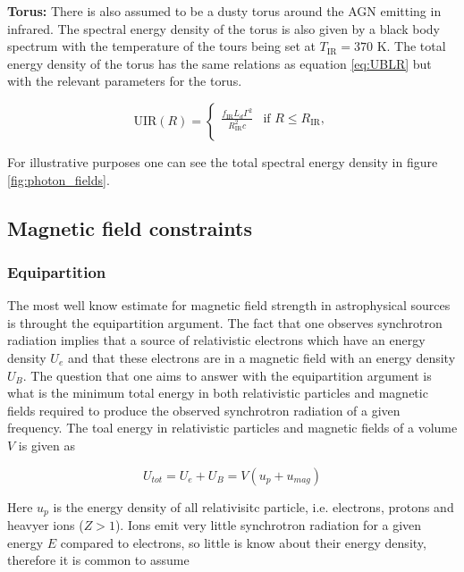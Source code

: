 \textbf{Torus:} There is also assumed to be a dusty torus around the AGN emitting in infrared. The spectral energy density of the torus is also given by 
a black body spectrum with the temperature of the tours being set at $T_{\text{IR}} = 370$ K. The total energy density of the torus has the same relations 
as equation \ref{eq:UBLR} but with the relevant parameters for the torus.

\begin{equation}
    \text{UIR}(R) = 
    \begin{cases}
    \frac{f_{\text{IR}}L_d  \Gamma^2}{R_{\text{IR}}^2 c} & \text{if } R \leq R_{\text{IR}}, \\
    \end{cases}
\end{equation}

For illustrative purposes one can see the total spectral energy density in figure \ref{fig:photon_fields}. 


\subsection{Magnetic field constraints}

\subsubsection{Equipartition}
The most well know estimate for magnetic field strength in astrophysical sources is throught the equipartition argument. The fact that one observes synchrotron radiation implies that a source of relativistic electrons which have an energy density $U_e$ and that these electrons are in a magnetic field with an energy density $U_B$. The question that one aims to answer with the equipartition argument is what is the minimum total energy in both relativistic particles and magnetic fields required to produce the observed synchrotron radiation of a given frequency. The toal energy in relativistic particles and magnetic fields of a volume $V$ is given as 

\begin{equation}
    U_{tot} = U_e + U_B = V(u_p + u_{mag})
\end{equation}

Here $u_p$ is the energy density of all relativisitc particle, i.e. electrons, protons and heavyer ions ($Z>1$). Ions emit very little synchrotron radiation for a given energy $E$ compared to electrons, so little is know about their energy density, therefore it is common to assume 

